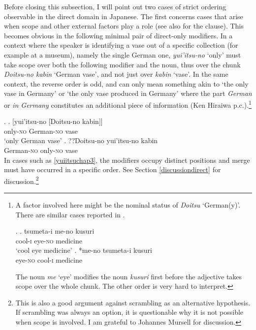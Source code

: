 Before closing this subsection, I will point out two cases of strict ordering observable in the direct domain in Japanese. The first concerns cases that arise when scope and other external factors play a role (see also \citealt{ramchand:2014:deriving} for the clause). This becomes obvious in the following minimal pair of direct-only modifiers. In a context where the speaker is identifying a vase out of a specific collection (for example at a museum), namely the single German one, \textit{yui'itsu-no} `only’ must take scope over both the following modifier and the noun, thus over the chunk \textit{Doitsu-no kabin} `German vase’, and not just over \textit{kabin} `vase’. In the same context, the reverse order is odd, and can only mean something akin to `the only vase in Germany' or `the only vase produced in Germany' where the part \textit{German} or \textit{in Germany} constitutes an additional piece of information (Ken Hiraiwa p.c.).\footnote{A factor involved here might be the nominal status of \textit{Doitsu} `German(y)’. There are similar cases reported in \citet{shimamura:2014:go}.

\par

\ex. \ag. tsumeta-i me-no kusuri\\
cool-\textsc{i} eye-\textsc{no} medicine\\
`cool eye medicine’
\bg. *me-no tsumeta-i kusuri\\
eye-\textsc{no} cool-\textsc{i} medicine \null \hfill \citep[163]{shimamura:2014:go}\\

\par

The noun \textit{me} `eye’ modifies the noun \textit{kusuri} first before the adjective takes scope over the whole chunk. The other order is very hard to interpret.}

\ex. \label{yuiitsuchap3} \ag. [yui'itsu-no [Doitsu-no kabin]]\\
only-\textsc{no} German-\textsc{no} vase\\
`only German vase'
\bg. ??Doitsu-no yui'itsu-no kabin\\
German-\textsc{no} only-\textsc{no} vase\\

In cases such as \ref{yuiitsuchap3}, the modifiers occupy distinct positions and merge must have occurred in a specific order. See Section \ref{discussiondirect} for discussion.\footnote{This is also a good argument against scrambling as an alternative hypothesis. If scrambling was always an option, it is questionable why it is not possible when scope is involved. I am grateful to Johannes Mursell for discussion.}

